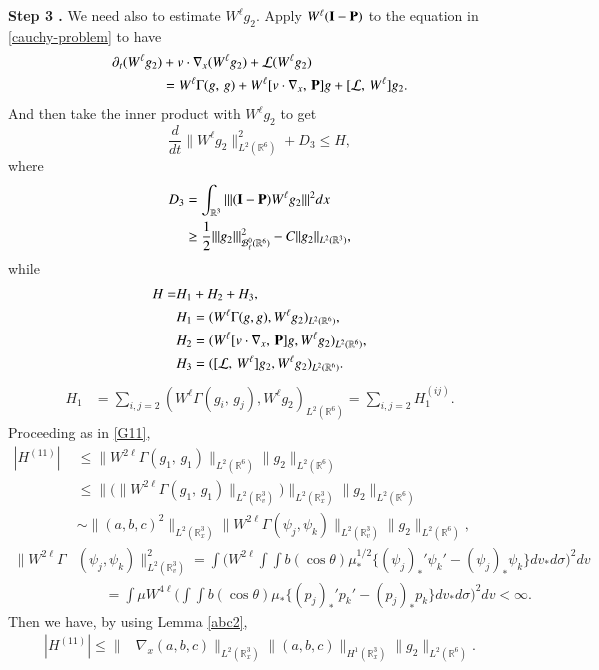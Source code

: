\documentclass{amsart}[12pt, article]
\begin{document}
\noindent
{\bf Step 3 .} We need also to estimate $W^\ell g_2$.
Apply $W^\ell ({{\bf I}}-{{\bf P}})$ to the equation in \eqref{cauchy-problem} to have
\begin{align*}
{{\partial}}_t(W^\ell g_2)&+ v\cdot\nabla_x (W^\ell g_2)
+ {{\mathcal L}}(W^\ell g_2)
\\&
=W^\ell\Gamma(g,\,
g)+W^\ell[v\cdot\nabla_x,\, {{\bf P}}]g+[{{\mathcal L}},\, W^\ell]g_2. \notag
\end{align*}
And then take the inner product with
$W^\ell g_2$ to get
\[
\frac{d}{dt}\|W^\ell g_2\|^2_{L^2({{{\mathbb R}}}^6)}+D_3\le H,
\]
where
\begin{align*}
 D_3&=\int_{{{{\mathbb R}}}^3}||| ({{\bf I}}-{{\bf P}})W^\ell g_2 |||^2dx
\\&\ge \frac 12|||  g_2 |||^2_{{{\mathcal B}}^{0}_\ell({{{\mathbb R}}}^6)}-
C\|g_2\|_{L^2({{{\mathbb R}}}^3)},
\end{align*}
while
\begin{align*}
H=&H_1+H_2+H_3,
\\&H_1=(W^\ell\Gamma(g,g), W^\ell g_2)_{L^2({{{\mathbb R}}}^6)},
\\&H_2=(W^\ell[v\cdot\nabla_x,\, {{\bf P}}]g,  W^\ell g_2)_{L^2({{{\mathbb R}}}^6)},
\\&H_3=([{{\mathcal L}},\, W^\ell]g_2, W^\ell g_2)_{L^2({{{\mathbb R}}}^6)}.
\end{align*}
\begin{align*}
H_1&=\sum_{i,j=2}(W^\ell \Gamma(g_i,\,g_j), W^\ell g_2)_{L^2({{{\mathbb R}}}^6)}
=\sum_{i,j=2}H_1^{(ij)}.
\end{align*}
Proceeding as in \eqref{G11},
\begin{align*}
|H^{(11)}|& \le
\|W^{2\ell}\Gamma(g_1,\,g_1)\|_{L^2({{{\mathbb R}}}^6)}    \| g_2\|_{L^2({{{\mathbb R}}}^6)}
\\&
\le \|\Big(\|W^{2\ell} \Gamma(g_1,\,g_1)\|_{L^2({{{\mathbb R}}}^3_v)}\Big)\|_{L^2({{{\mathbb R}}}^3_x)}
\| g_2\|_{L^2({{{\mathbb R}}}^6)}
\\& 
\sim \|(a,b,c)^2\|_{L^2({{{\mathbb R}}}^3_x)}\|W^{2\ell}
\Gamma(\psi_j,\psi_k)\|_{L^2({{{\mathbb R}}}^3_v)}
\| g_2\|_{L^2({{{\mathbb R}}}^6)},
\\ 
\|W^{2\ell}\Gamma&(\psi_j,\psi_k)\|_{L^2({{{\mathbb R}}}^3_v)}^2
=\int\Big(W^{2\ell}\int\int b(\cos\theta)\mu_*^{1/2}
\{ (\psi_j)_*' \psi_k'-(\psi_j)_*\psi_k\}dv_*d\sigma\Big)^2dv 
\\&\qquad 
=\int\mu W^{4\ell}\Big(\int\int b(\cos\theta)\mu_*
\{ (p_j)_*' p_k'-(p_j)_*p_k\}dv_*d\sigma\Big)^2dv<\infty.
\end{align*}
Then we have, by using Lemma \ref{abc2},
\begin{align*}\label{H111}
|H^{(11)}|\le \|&\nabla_x(a,b,c)\|_{L^2({{{\mathbb R}}}^3_x)}\|(a,b,c)\|_{H^{1}({{{\mathbb R}}}^3_x)}\| g_2\|_{L^2({{{\mathbb R}}}^6)}.
\end{align*}
\end{document}
